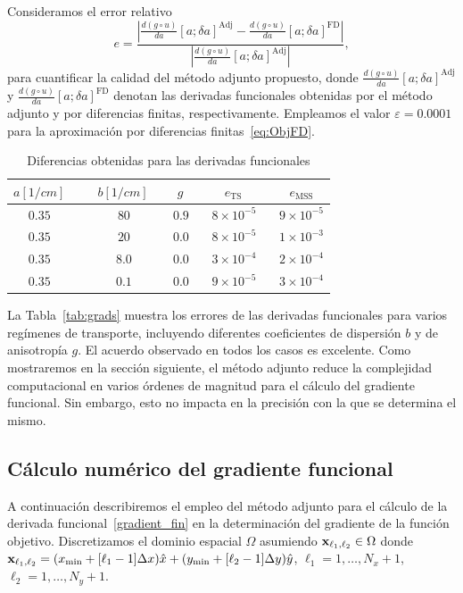  Consideramos el error relativo
\begin{equation}
 e=\displaystyle \frac{\left|\frac{d (g\circ u)}{da}[a;\delta a]^\mathrm{Adj}- \frac{d (g\circ u)}{da}[a;\delta a]^\mathrm{FD}\right|}{|\frac{d (g\circ u)}{da}[a;\delta a]^\mathrm{Adj}|},
\label{eq:Errgrad}
\end{equation}
para cuantificar la calidad del método adjunto propuesto, donde
$\frac{d (g\circ u)}{da}[a;\delta a]^\mathrm{Adj}$ y
$\frac{d (g\circ u)}{da}[a;\delta a]^\mathrm{FD}$ denotan 
las derivadas funcionales obtenidas por el método adjunto y por 
diferencias finitas, respectivamente. Empleamos el valor $\varepsilon=0.0001$ 
para la aproximación por diferencias finitas~\eqref{eq:ObjFD}.
\begin{table}[h!]
\caption{Diferencias obtenidas para las derivadas funcionales}
\vspace{-0.3cm}
\begin{center}
\begin{tabular}{cccccc}
\hline
$a[1/cm]$ & ~ & $b[1/cm]$ ~ & $g$ ~ & $e_{\text{TS}}$  ~ & $e_{\text{MSS}}$ \\
\hline
$0.35$ & ~ & $80$ ~ &$0.9$ ~ & $8\times 10^{-5}$  ~ & $9\times 10^{-5}$ \\
$0.35$ & ~ & $20$ ~ &$0.0$ ~ & $8\times 10^{-5}$  ~ & $1\times 10^{-3}$ \\
$0.35$ & ~ & $8.0$ ~ &$0.0$ ~ & $3\times 10^{-4}$  ~ & $2\times 10^{-4}$ \\
$0.35$ & ~ & $0.1$ ~ &$0.0$ ~ & $9\times 10^{-5}$  ~ & $3\times 10^{-4}$ \\
\hline
\end{tabular}
\label{tab:grads}
\end{center}
\end{table}
La Tabla~\eqref{tab:grads} muestra los errores de las derivadas funcionales 
para varios regímenes de transporte, incluyendo diferentes  coeficientes de dispersión $b$ y de anisotropía $g$. 
El acuerdo observado en todos los casos es excelente. 
Como mostraremos en la sección siguiente, el método adjunto reduce la complejidad computacional 
en varios órdenes de magnitud para el cálculo del gradiente 
funcional. 
Sin embargo, esto no impacta en la precisión con la que se determina el mismo.

\subsection{Cálculo numérico del gradiente funcional}
\label{sec:gradc}
A continuación describiremos el empleo del método adjunto 
para el cálculo de la derivada funcional~\eqref{gradient_fin} 
en la determinación del gradiente de la función objetivo.
Discretizamos el dominio espacial $\Omega$ asumiendo $\mathbf{x}_{\ell_1,\ell_2} \in \Omega$  donde 
$\mathbf{x}_{\ell_1,\ell_2} =(x_{\text{min}}+ [\ell_1-1]\Delta x)\hat x
+(y_{\text{min}}+[\ell_2-1]\Delta y)\hat y$, $\ell_1=1,\ldots,N_x+1$,
$\ell_2=1,\ldots,N_y+1$. 

